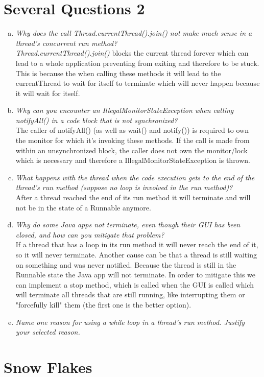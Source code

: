 \documentclass{report}
\begin{document}
	\section{Several Questions 2}
	\startsection
		\begin{enumerate}[a)]
			\item \textit{Why does the call Thread.currentThread().join() not make much sense in a thread’s concurrent run
method?} \\
			\textit{Thread.currentThread().join()} blocks the current thread forever which can lead to a whole application preventing from exiting and therefore to be stuck. This is because the when calling these methods it will lead to the currentThread to wait for itself to terminate which will never happen because it will wait for itself.
			\item \textit{Why can you encounter an IllegalMonitorStateException when calling notifyAll() in a code block
that is not synchronized?} \\
			The caller of notifyAll() (as well as wait() and notify()) is required to own the monitor for which it's invoking these methods. If the call is made from within an unsynchronized block, the caller does not own the monitor/lock which is necessary and therefore a IllegalMonitorStateException is thrown.
			\item \textit{What happens with the thread when the code execution gets to the end of the thread’s run method
(suppose no loop is involved in the run method)?} \\
			After a thread reached the end of its run method it will terminate and will not be in the state of a Runnable anymore.
			\item \textit{Why do some Java apps not terminate, even though their GUI has been closed, and how can you
mitigate that problem?} \\
			If a thread that has a loop in its run method it will never reach the end of it, so it will never terminate. Another cause can be that a thread is still waiting on something and was never notified. Because the thread is still in the Runnable state the Java app will not terminate. In order to mitigate this we can implement a stop method, which is called when the GUI is called which will terminate all threads that are still running, like interrupting them or "forcefully kill" them (the first one is the better option).
			\item \textit{Name one reason for using a while loop in a thread’s run method. Justify your selected reason.} \\
		\end{enumerate}
	\closesection
	
	\section{Snow Flakes}
	\startsection
		\begin{enumerate}
		\end{enumerate}
	\closesection
\end{document}
